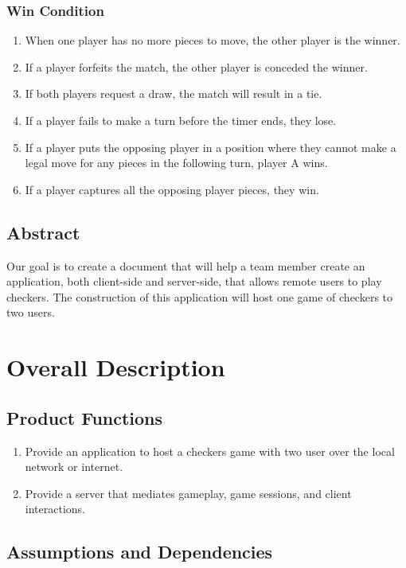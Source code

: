 \documentclass[10pt]{article}
\begin{document}
\subsubsection{Win Condition}
\begin{enumerate}
    \item When one player has no more pieces to move, the other player is the winner.
    \item If a player forfeits the match, the other player is conceded the winner.
    \item If both players request a draw, the match will result in a tie.
    \item If a player fails to make a turn before the timer ends, they lose.
    \item If a player puts the opposing player in a position where they cannot make a legal move for any pieces in the following turn, player A wins.
    \item If a player captures all the opposing player pieces, they win.
\end{enumerate}

\subsection{Abstract}

Our goal is to create a document that will help a team member create an application, 
both client-side and server-side, that allows remote users to play checkers. The construction of this application will host one game of checkers to two users. 
\section{Overall Description}

\subsection{Product Functions}

\begin{enumerate}
    \item Provide an application to host a checkers game with two user over the local network or internet.
    \item Provide a server that mediates gameplay, game sessions, and client interactions.
\end{enumerate}

\subsection{Assumptions and Dependencies}
\end{document}

